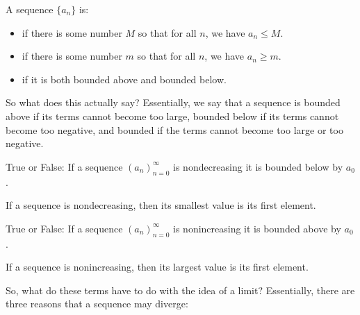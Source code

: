 \documentclass{ximera}
\begin{document}
\begin{definition}
  \label{definition:sequence-bounded}
  A sequence $\{a_n\}$ is:
  
  \begin{itemize}
  \item {} if there is some number $M$ so
  that for all $n$, we have $a_n\le M$.
    \item {} if there is some number $m$ so
  that for all $n$, we have $a_n\ge m$.
  \item {} if it is both bounded above and bounded below.
  \end{itemize}
\end{definition}

So what does this actually say? Essentially, we say that a sequence is bounded above if its terms cannot become too large, bounded below if its terms cannot become too negative, and bounded if the terms cannot become too large or too negative.

\begin{question}
  True or False: If a sequence $(a_n)_{n=0}^\infty$ is nondecreasing
  it is bounded below by $a_0$.
  \begin{prompt}
    \begin{multipleChoice}
    \end{multipleChoice}
  \end{prompt}
  \begin{feedback}
    If a sequence is nondecreasing, then its smallest value is its
    first element.
  \end{feedback}
\end{question}


\begin{question}
  True or False: If a sequence $(a_n)_{n=0}^\infty$ is nonincreasing
  it is bounded above by $a_0$.
  \begin{prompt}
    \begin{multipleChoice}
    \end{multipleChoice}
  \end{prompt}
  \begin{feedback}
    If a sequence is nonincreasing, then its largest value is its
    first element.
  \end{feedback}
\end{question}

So, what do these terms have to do with the idea of a limit?  Essentially, there are three reasons that a sequence may diverge:
\end{document}
